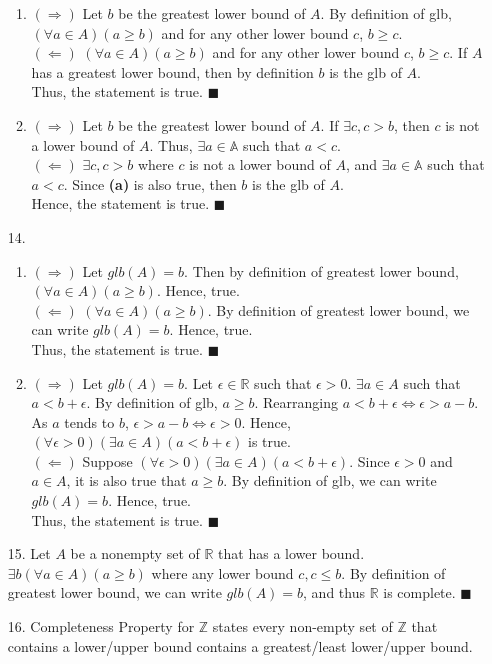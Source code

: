 \documentclass[11pt]{exam}
\begin{document}
\begin{enumerate}[leftmargin=0pt]
\begin{enumerate}[label=(\alph*)]
    \item $(\Rightarrow)$ Let $b$ be the greatest lower bound of $A$. By definition of glb, $(\forall a \in A)(a \geq b)$ and for any other lower bound $c$, $b \geq c$. \\
    $(\Leftarrow)$ $(\forall a \in A)(a \geq b)$ and for any other lower bound $c$, $b \geq c$. If $A$ has a greatest lower bound, then by definition $b$ is the glb of $A$. \\
    Thus, the statement is true. $\blacksquare$
    \item $(\Rightarrow)$ Let $b$ be the greatest lower bound of $A$. If $\exists c, c > b$, then $c$ is not a lower bound of $A$. Thus, $\exists a \in \mathbb{A}$ such that $a < c$. \\
    $(\Leftarrow)$ $\exists c, c > b$ where $c$ is not a lower bound of $A$, and $\exists a \in \mathbb{A}$ such that $a < c$. Since \textbf{(a)} is also true, then $b$ is the glb of $A$. \\
    Hence, the statement is true. $\blacksquare$
\end{enumerate}

\item[14.]
\begin{enumerate}[label=(\alph*)]
    \item $(\Rightarrow)$ Let $glb(A) = b$. Then by definition of greatest lower bound, $(\forall a \in A)(a \geq b)$. Hence, true. \\
    $(\Leftarrow)$ $(\forall a \in A)(a \geq b)$. By definition of greatest lower bound, we can write $glb(A) = b$. Hence, true. \\
    Thus, the statement is true. $\blacksquare$
    \item $(\Rightarrow)$ Let $glb(A) = b$. Let $\epsilon \in \mathbb{R}$ such that $\epsilon > 0$. $\exists a \in A$ such that $a < b + \epsilon$. By definition of glb, $a \geq b$. Rearranging $a < b + \epsilon \Leftrightarrow \epsilon > a - b$. As $a$ tends to $b$, $\epsilon > a - b \Leftrightarrow \epsilon > 0$. Hence, $(\forall \epsilon > 0)(\exists a \in A)(a < b + \epsilon)$ is true. \\
    $(\Leftarrow)$ Suppose $(\forall \epsilon > 0)(\exists a \in A)(a < b + \epsilon)$. Since $\epsilon > 0$ and $a \in A$, it is also true that $a \geq b$. By definition of glb, we can write $glb(A) = b$. Hence, true. \\
    Thus, the statement is true. $\blacksquare$
\end{enumerate}

\item[15.] Let $A$ be a nonempty set of $\mathbb{R}$ that has a lower bound. $\exists b (\forall a \in A)(a \geq b)$ where any lower bound $c, c \leq b$. By definition of greatest lower bound, we can write $glb(A) = b$, and thus $\mathbb{R}$ is complete. $\blacksquare$

\item[16.] Completeness Property for $\mathbb{Z}$ states every non-empty set of $\mathbb{Z}$ that contains a lower/upper bound contains a greatest/least lower/upper bound.

\end{enumerate}
\end{document}
